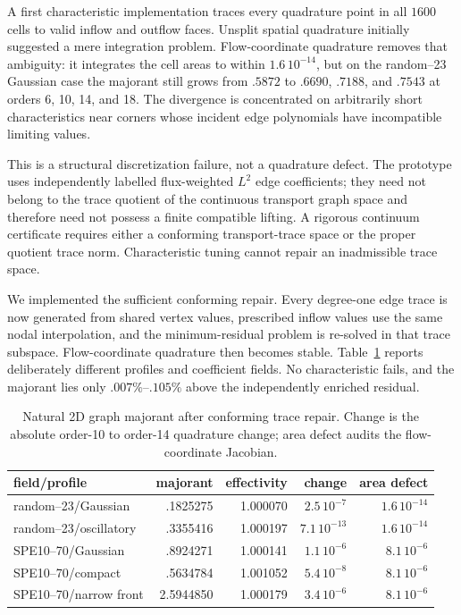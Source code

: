 \documentclass[11pt]{article}
\numberwithin{algorithm}{section}
\theoremstyle{definition}\newtheorem{definition}[theorem]{Definition}
\theoremstyle{remark}\newtheorem{remark}[theorem]{Remark}
\begin{document}
A first characteristic implementation traces every quadrature point in all
$1600$ cells to valid inflow and outflow faces.  Unsplit spatial quadrature
initially suggested a mere integration problem.  Flow-coordinate quadrature
removes that ambiguity: it integrates the cell areas to within
$1.6\,10^{-14}$, but on the random--23 Gaussian case the majorant still grows
from $.5872$ to $.6690$, $.7188$, and $.7543$ at orders 6, 10, 14, and 18.
The divergence is concentrated on arbitrarily short characteristics near
corners whose incident edge polynomials have incompatible limiting values.

This is a structural discretization failure, not a quadrature defect.  The
prototype uses independently labelled flux-weighted $L^2$ edge coefficients;
they need not belong to the trace quotient of the continuous transport graph
space and therefore need not possess a finite compatible lifting.  A rigorous
continuum certificate requires either a conforming transport-trace space or
the proper quotient trace norm.  Characteristic tuning cannot repair an
inadmissible trace space.

We implemented the sufficient conforming repair.  Every degree-one edge trace
is now generated from shared vertex values, prescribed inflow values use the
same nodal interpolation, and the minimum-residual problem is re-solved in
that trace subspace.  Flow-coordinate quadrature then becomes stable.
Table~\ref{tab:conforming-trace-majorant} reports deliberately different
profiles and coefficient fields.  No characteristic fails, and the majorant
lies only $.007\%$--$.105\%$ above the independently enriched residual.

\begin{table}[t]
\centering
\caption{Natural 2D graph majorant after conforming trace repair.  Change is
the absolute order-10 to order-14 quadrature change; area defect audits the
flow-coordinate Jacobian.}
\label{tab:conforming-trace-majorant}
\begin{tabular}{lrrrr}
\toprule
field/profile & majorant & effectivity & change & area defect\\
\midrule
random--23/Gaussian & .1825275 & 1.000070 & $2.5\,10^{-7}$ & $1.6\,10^{-14}$\\
random--23/oscillatory & .3355416 & 1.000197 & $7.1\,10^{-13}$ & $1.6\,10^{-14}$\\
SPE10--70/Gaussian & .8924271 & 1.000141 & $1.1\,10^{-6}$ & $8.1\,10^{-6}$\\
SPE10--70/compact & .5634784 & 1.001052 & $5.4\,10^{-8}$ & $8.1\,10^{-6}$\\
SPE10--70/narrow front & 2.5944850 & 1.000179 & $3.4\,10^{-6}$ & $8.1\,10^{-6}$\\
\bottomrule
\end{tabular}
\end{table}
\end{document}
